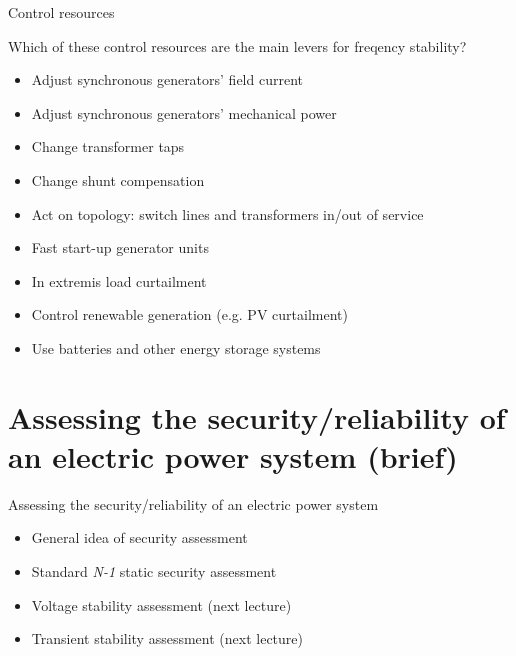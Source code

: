 \begin{frame}{Control resources}

    Which of these control resources are the main levers for freqency stability?
      \begin{itemize}
          \item Adjust synchronous generators' field current
          \item \alert{Adjust synchronous generators' mechanical power}
          \item Change transformer taps
          \item Change shunt compensation
          \item Act on topology: switch lines and transformers in/out of service
          \item \alert{Fast start-up generator units}
          \item \alert{In extremis load curtailment}
          \item \alert{Control renewable generation (e.g. PV curtailment)}
          \item \alert{Use batteries and other energy storage systems} %
      \end{itemize}
\end{frame}

\section{Assessing the security/reliability of an electric power system (brief)}
\begin{frame}{Assessing the security/reliability of an electric power system}
    \begin{itemize}
        \item General idea of security assessment
        \item Standard \textit{N-1} static security assessment
        \item Voltage stability assessment (next lecture)
        \item Transient stability assessment (next lecture)
    \end{itemize}
\end{frame}

